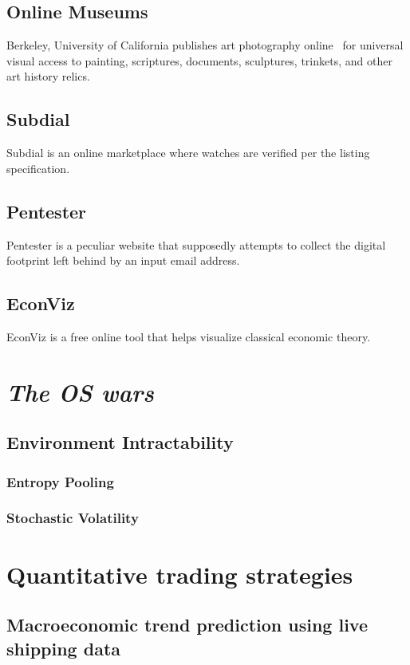 \documentclass[11pt]{article}
\begin{document}
\subsection{Online Museums}
Berkeley, University of California publishes art photography online~\cite{a2024_library} for universal visual access to painting, scriptures, documents, sculptures, trinkets, and other art history relics.
\subsection{Subdial~\cite{a2023_subdial}}
Subdial is an online marketplace where watches are verified per the listing specification.
\subsection{Pentester~\cite{a2024_pentester}}
Pentester is a peculiar website that supposedly attempts to collect the digital footprint left behind by an input email address.
\subsection{EconViz~\cite{econvizorgmacroeconomicvisualizations_2025_econvizorg}}
EconViz is a free online tool that helps visualize classical economic theory.

\section{\textit{The OS wars}}
\subsection{Environment Intractability}
\subsubsection{Entropy Pooling~\cite{vorobets_2024_portfolio}}
\subsubsection{Stochastic Volatility~\cite{heston_1993_a}~\cite{briciu_2024_estimating}}
\section{Quantitative trading strategies}
\subsection{Macroeconomic trend prediction using live shipping data}
\end{document}
